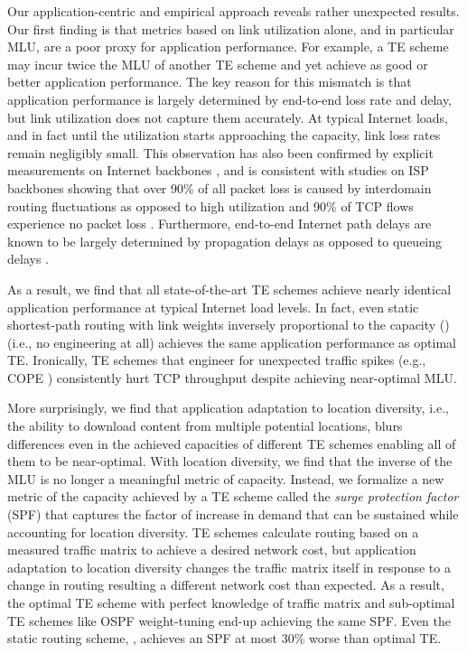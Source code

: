 {	Our application-centric and empirical approach reveals rather unexpected results. Our first finding is that metrics based on link utilization alone, and in particular MLU, are a poor proxy for application performance. For example, a TE scheme may incur twice the MLU of another TE scheme and yet achieve as good or better application performance. The key reason for this mismatch is that application performance is largely determined by end-to-end loss rate and delay, but link utilization does not capture them accurately. At typical Internet loads, and in fact until the utilization starts approaching the capacity, link loss rates remain negligibly small. This observation has also been confirmed by explicit measurements on Internet backbones \cite{ExpRouterBuffer}, and is consistent with studies on ISP backbones showing that over 90\% of all packet loss is caused by interdomain routing fluctuations as opposed to high utilization \cite{SprintStudy} and 90\% of TCP flows experience no packet loss \cite{SprintBackbone}. Furthermore, end-to-end Internet path delays are known to be largely determined by propagation delays as opposed to queueing delays \cite{SprintBackbone,SingleHopDelay}. 
	
	As a result, we find that all state-of-the-art TE schemes achieve nearly identical application performance at typical Internet load levels. In fact, even static shortest-path routing with link weights inversely proportional to the capacity (\invcap) (i.e., no engineering at all) achieves the same application performance as optimal TE. Ironically, TE schemes that engineer for unexpected traffic spikes (e.g., COPE \cite{COPE}) consistently hurt TCP throughput despite achieving near-optimal MLU.
	
	More surprisingly, we find that application adaptation to location diversity,  i.e., the ability to download content from multiple potential locations, blurs differences even in the achieved capacities of different TE schemes enabling all of them to be near-optimal. With location diversity, we find that the inverse of the MLU is no longer a meaningful metric of capacity. Instead, we formalize a new metric of the capacity achieved by a TE scheme called the {\em surge protection factor} (SPF) that captures the factor of increase in demand that can be sustained while accounting for location diversity. TE schemes calculate routing based on a measured traffic matrix to achieve a desired network cost, but application adaptation to location diversity changes the traffic matrix itself in response to a change in routing resulting a different network cost than expected. As a result, the optimal TE scheme with perfect knowledge of traffic matrix and sub-optimal TE schemes like OSPF weight-tuning \cite{fortz2000internet} end-up achieving the same SPF. Even the static routing scheme, \invcap, achieves an SPF at most 30\% worse than optimal TE.
}
